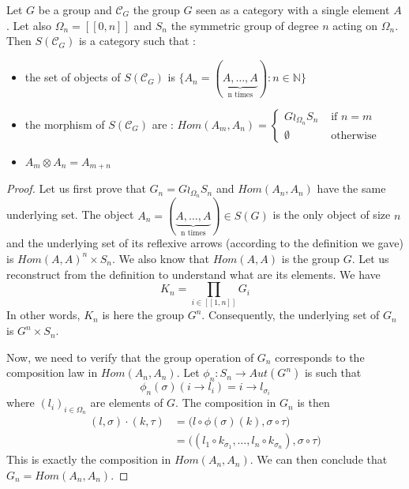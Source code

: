 \documentclass{report}
\begin{document}
\begin{prop}
    Let $G$ be a group and $\mathcal{C}_G$ the group $G$ seen as a category with a single element $A$. Let also $\Omega_n = [\![0,n]\!]$ and $S_n$ the symmetric group of degree $n$ acting on $\Omega_n$. Then $S(\mathcal{C}_G)$ is a category such that :
    \begin{itemize}
        \item the set of objects of $S(\mathcal{C}_G)$ is $\{A_n = (\underbrace{A,\dots,A}_\textrm{n times}) : n\in \mathbb{N}\}$
        \item the morphism of $S(\mathcal{C}_G)$ are : $Hom(A_m,A_n) = \begin{cases}
                      G\wr_{\Omega_n}S_n & \mbox{ if } n = m \\
                      \emptyset          & \mbox{ otherwise}
                  \end{cases}$
        \item $A_m\otimes A_n = A_{m+n}$
    \end{itemize}

\end{prop}

\begin{proof}
    Let us first prove that $G_n = G\wr_{\Omega_n}S_n$ and $Hom(A_n,A_n)$ have the same underlying set.
    The object $A_n = (\underbrace{A,\dots,A}_\textrm{n times})\in S(G)$ is the only object of size $n$ and the underlying set of its reflexive arrows (according to the definition we gave) is $ Hom(A,A)^{n} \times S_n$. We also know that $Hom(A,A)$ is the group $G$.
    Let us reconstruct from the definition to understand what are its elements.
    We have $$K_n = \prod_{i\in [\![1,n]\!]}G_i$$
    In other words, $K_n$ is here the group $G^n$. Consequently, the underlying set of $G_n$ is $G^n\times S_n$. 
    \vspace{0.5cm}

    Now, we need to verify that the group operation of $G_n$ corresponds to the composition law in $Hom(A_n,A_n)$.
    Let $\phi_n : S_n \rightarrow Aut(G^n)$ is such that $$\phi_n(\sigma)(i\rightarrow l_i) = i \rightarrow l_{\sigma_i}$$ where $(l_i)_{i\in \Omega_n}$ are elements of $G$. The composition in $G_n$ is then
    \begin{align*}
        (l,\sigma)\cdot (k,\tau) &= \big(l\circ \phi(\sigma)(k),\sigma\circ\tau\big)\\
        & = \big((l_1 \circ k_{\sigma_1},\dots, l_n \circ k_{\sigma_n}),\sigma\circ\tau\big)
    \end{align*}
    This is exactly the composition in $Hom(A_n,A_n)$. We can then conclude that $G_n = Hom(A_n,A_n)$.

\end{proof}
\end{document}
